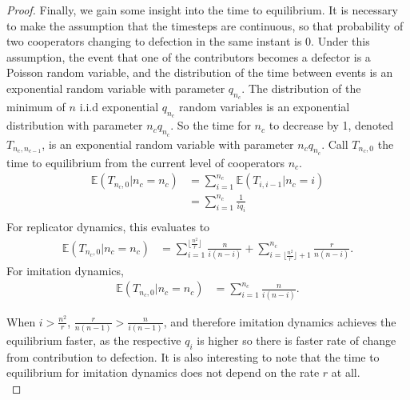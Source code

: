 \begin{proof}
Finally, we gain some insight into the time to equilibrium. It is necessary to make the assumption that the timesteps are continuous, so that probability of two cooperators changing to defection in the same instant is 0. Under this assumption, the event that one of the contributors becomes a defector is a Poisson random variable, and the distribution of the time between events is an exponential random variable with parameter $q_{n_c}$. The distribution of the minimum of $n$ i.i.d exponential $q_{n_c}$ random variables is an exponential distribution with parameter $n_c q_{n_c}$. So the time for $n_c$ to decrease by 1, denoted $T_{{n_c},{n_{c-1}}}$, is an exponential random variable with parameter $n_c q_{n_c}$. Call $T_{n_c, 0}$ the time to equilibrium from the current level of cooperators $n_c$. 
\begin{align*}
    \mathbb E (T_{n_c, 0} | n_c = n_c) &= \sum_{i = 1}^{n_c} \mathbb E (T_{{i}, {i-1}}|n_c = i)\\
    &= \sum_{i = 1}^{n_c} \frac{1}{iq_i}\\
\end{align*}
For replicator dynamics, this evaluates to 
\begin{align*}
       \mathbb E (T_{n_c, 0} | n_c = n_c) &= \sum_{i =1}^{\lfloor \frac{n^2}{r} \rfloor} \frac{n}{i(n-i)}+ \sum_{i=\lfloor \frac{n^2}{r}\rfloor+1}^{n_c}  \frac{r}{n(n-i)}. 
\end{align*}
For imitation dynamics, 
\begin{align*}
    \mathbb E (T_{n_c, 0} | n_c = n_c) &= \sum_{i = 1}^{n_c} \frac{n}{i(n-i)}. 
\end{align*}

When $i>\frac{n^2}{r}$, $\frac{r}{n(n-1)}>\frac{n}{i(n-1)}$, and therefore imitation dynamics achieves the equilibrium faster, as the respective $q_i$ is higher so there is faster rate of change from contribution to defection. It is also interesting to note that the time to equilibrium for imitation dynamics does not depend on the rate $r$ at all. \\

\end{proof}

